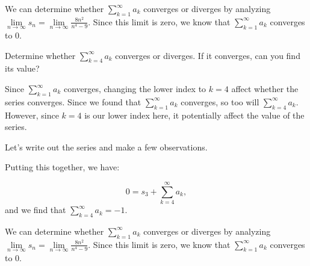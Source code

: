 \documentclass{ximera}
\begin{document}
\begin{example}
\begin{question}
\begin{explanation}
We can determine whether $\sum\limits_{k=1}^{\infty} a_k$ converges or diverges by analyzing $\lim\limits_{n \to \infty} s_n = \lim\limits_{n \to \infty} \frac{8n^2}{n^4-9}$.  Since this limit is zero, we know that $\sum\limits_{k=1}^{\infty} a_k$ converges to $0$.
\end{explanation}
\end{question}

\begin{question}
Determine whether $\sum\limits_{k=4}^{\infty} a_k$ converges or diverges.  If it converges, can you find its value?

\begin{explanation}
Since $\sum\limits_{k=1}^{\infty} a_k$ converges, changing the lower index to $k=4$   affect whether the series converges.  Since we found that $\sum\limits_{k=1}^{\infty} a_k$ converges, so too will $\sum\limits_{k=4}^{\infty} a_k$.  However, since $k=4$ is our lower index here, it  potentially affect the value of the series.

Let's write out the series and make a few observations.

\begin{image}
  \end{image}
  
 Putting this together, we have:
 
 \[
 0 = s_3 + \sum\limits_{k=4}^{\infty} a_k,
 \] 
 and we find that $ \sum\limits_{k=4}^{\infty} a_k = -1$. 

We can determine whether $\sum\limits_{k=1}^{\infty} a_k$ converges or diverges by analyzing $\lim\limits_{n \to \infty} s_n = \lim\limits_{n \to \infty} \frac{8n^2}{n^4-9}$.  Since this limit is zero, we know that $\sum\limits_{k=1}^{\infty} a_k$ converges to $0$.
\end{explanation}
\end{question}

\end{example}
\end{document}
